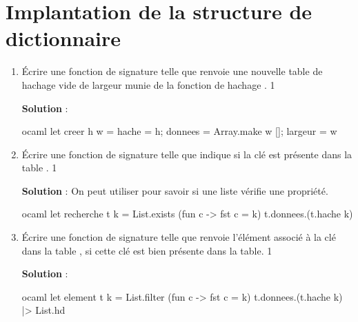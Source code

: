 \documentclass[10pt,a4paper, varwidth]{article}
\def\cor{1}
\begin{document}
	\section{Implantation de la structure de dictionnaire}
	\begin{enumerate}
		\item Écrire une fonction  de signature 
		telle que  renvoie une nouvelle table de hachage vide de largeur  munie de la fonction de
		hachage .
        \if\cor1
        \begin{emphase}
            \textbf{Solution} : 
            \begin{center}
\begin{code}{ocaml}
let creer h w =
    {hache = h; donnees = Array.make w []; largeur = w}
\end{code}
            \end{center}
        \end{emphase}
        \fi
		\item Écrire une fonction  de signature  telle que 
		indique si la clé  est présente dans la table .
		\if\cor1
        \begin{emphase}
            \textbf{Solution} : On peut utiliser  pour savoir si une liste vérifie une propriété.
            \begin{center}
\begin{code}{ocaml}
let recherche t k =
    List.exists (fun c -> fst c = k) t.donnees.(t.hache k) 
\end{code}
            \end{center}
        \end{emphase}
        \fi
        \item Écrire une fonction  de signature  telle que  renvoie
		l'élément associé à la clé  dans la table , si cette clé est bien présente dans la table.
        \if\cor1
        \begin{emphase}
            \textbf{Solution} : 
            \begin{center}
\begin{code}{ocaml}
let element t k =
    List.filter (fun c -> fst c  = k) t.donnees.(t.hache k)
    |> List.hd 
\end{code}

\end{center}
\end{emphase}
\end{enumerate}
\end{document}
